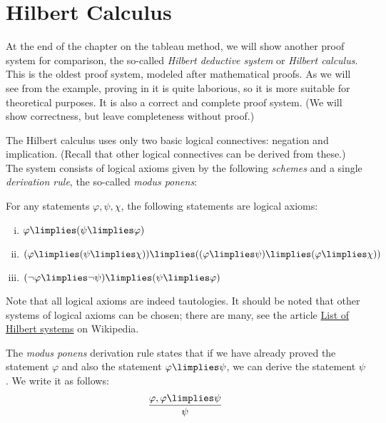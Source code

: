 \section{Hilbert Calculus}\label{section:hilbert-calculus-propositional}

At the end of the chapter on the tableau method, we will show another proof system for comparison, the so-called \emph{Hilbert deductive system} or \emph{Hilbert calculus}. This is the oldest proof system, modeled after mathematical proofs. As we will see from the example, proving in it is quite laborious, so it is more suitable for theoretical purposes. It is also a correct and complete proof system. (We will show correctness, but leave completeness without proof.)

The Hilbert calculus uses only two basic logical connectives: negation and implication. (Recall that other logical connectives can be derived from these.) The system consists of logical axioms given by the following \emph{schemes} and a single \emph{derivation rule}, the so-called \emph{modus ponens}: 

\begin{definition}
For any statements $\varphi, \psi, \chi$, the following statements are logical axioms:
\begin{enumerate}[(i)]
    \item $\varphi \limplies (\psi \limplies \varphi)$
    \item $(\varphi \limplies (\psi \limplies \chi)) \limplies ((\varphi \limplies \psi) \limplies (\varphi \limplies \chi))$
    \item $(\neg \varphi \limplies \neg \psi) \limplies (\psi \limplies \varphi)$
\end{enumerate}        
\end{definition}

Note that all logical axioms are indeed tautologies. It should be noted that other systems of logical axioms can be chosen; there are many, see the article \href{https://en.wikipedia.org/wiki/List_of_Hilbert_systems}{List of Hilbert systems} on Wikipedia.

\begin{definition}
The \emph{modus ponens} derivation rule states that if we have already proved the statement $\varphi$ and also the statement $\varphi \limplies \psi$, we can derive the statement $\psi$. We write it as follows:
$$
\frac{\varphi, \varphi \limplies \psi}{\psi}
$$ 
\end{definition}

